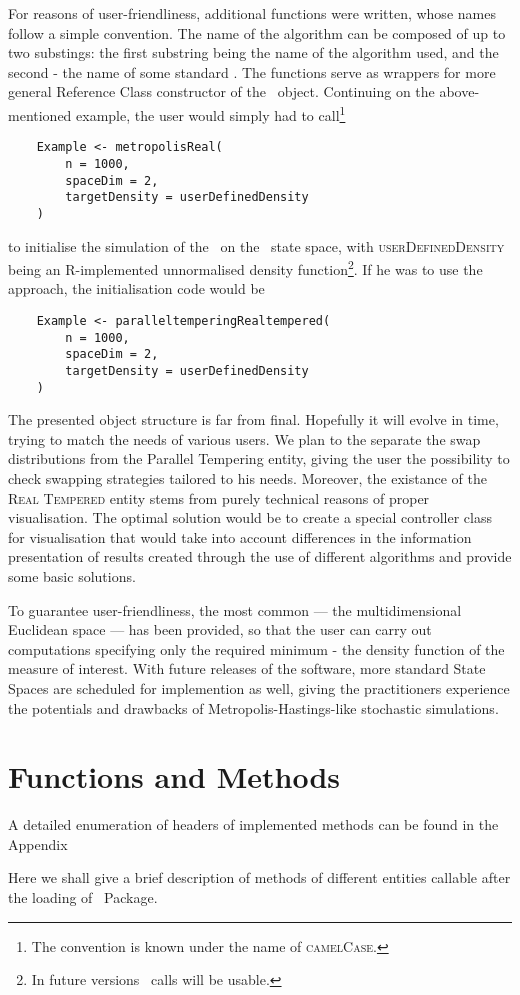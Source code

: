 \documentclass{book}
\begin{document}
For reasons of user-friendliness, additional functions were written, whose names follow a simple convention. The name of the algorithm can be composed of up to two substings: the first substring being the name of the algorithm used, and the second - the name of some standard \sspace. The functions serve as wrappers for more general Reference Class constructor of the \simulation\, object. Continuing on the above-mentioned example, the user would simply had to call\footnote{The convention is known under the name of \textsc{camelCase}.}

\begin{lstlisting}
	Example <- metropolisReal(
		n = 1000,
		spaceDim = 2,
		targetDensity = userDefinedDensity
	)
\end{lstlisting}  
to initialise the simulation of the \MHalgo\, on the \rspace\, state space, with \textsc{userDefinedDensity} being an R-implemented unnormalised density function\footnote{In future versions \Cpp\, calls will be usable.}. If he was to use the \PTalgo\, approach, the initialisation code would be 

\begin{lstlisting}
	Example <- paralleltemperingRealtempered(
		n = 1000,
		spaceDim = 2,
		targetDensity = userDefinedDensity
	)
\end{lstlisting}

The presented object structure is far from final. Hopefully it will evolve in time, trying to match the needs of various users. We plan to the separate the swap distributions from the Parallel Tempering entity, giving the user the possibility to check swapping strategies tailored to his needs. Moreover, the existance of the \textsc{Real Tempered} entity stems from purely technical reasons of proper visualisation. The optimal solution would be to create a special controller class for visualisation that would take into account differences in the information presentation of results created through the use of different algorithms and provide some basic solutions.

To guarantee user-friendliness, the most common \sspace --- the multidimensional Euclidean space --- has been provided, so that the user can carry out computations specifying only the required minimum - the density function of the measure of interest. With future releases of the software, more standard State Spaces are scheduled for implemention as well, giving the practitioners experience the potentials and drawbacks of Metropolis-Hastings-like stochastic simulations.

\section{Functions and Methods}

A detailed enumeration of headers of implemented methods can be found in the Appendix 

Here we shall give a brief description of methods of different entities callable after the loading of \ssimul\, Package.
\end{document}
